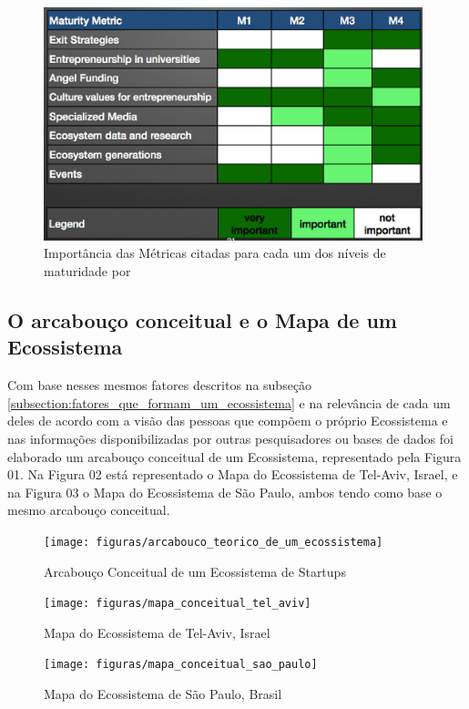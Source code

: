 \begin{figure}[!htb]
\centering
\includegraphics[width=11cm,angle=0]{figuras/metrics_importance}
\caption{Importância das Métricas citadas para cada um dos níveis de maturidade por }
\label{figure:metrics_importance}
\end{figure}

\subsection{O arcabouço conceitual e o Mapa de um Ecossistema}
\label{subsection:arcabouco_conceitual_e_modelo}

Com base nesses mesmos fatores descritos na subseção \ref{subsection:fatores_que_formam_um_ecossistema} e na relevância de cada um deles de acordo com a visão das pessoas que compõem o próprio Ecossistema e nas informações disponibilizadas por outras pesquisadores ou bases de dados foi elaborado um arcabouço conceitual de um Ecossistema, representado pela Figura 01. Na Figura 02 está representado o Mapa do Ecossistema de Tel-Aviv, Israel, e na Figura 03 o Mapa do Ecossistema de São Paulo, ambos tendo como base o mesmo arcabouço conceitual.

\begin{figure}[!htb]
\centering
\texttt{[image: figuras/arcabouco\_teorico\_de\_um\_ecossistema]}
\caption{Arcabouço Conceitual de um Ecossistema de Startups}
\label{figure:arcabouco_teorico_de_um_ecossistema}
\end{figure}

\begin{figure}[!htbp]
\centering
\texttt{[image: figuras/mapa\_conceitual\_tel\_aviv]}
\caption{Mapa do Ecossistema de Tel-Aviv, Israel}
\label{figure:mapa_conceitual_tel_aviv}
\end{figure}

\begin{figure}[!htbp]
\centering
\texttt{[image: figuras/mapa\_conceitual\_sao\_paulo]}
\caption{Mapa do Ecossistema de São Paulo, Brasil}
\label{figure:mapa_conceitual_sao_paulo}
\end{figure}

